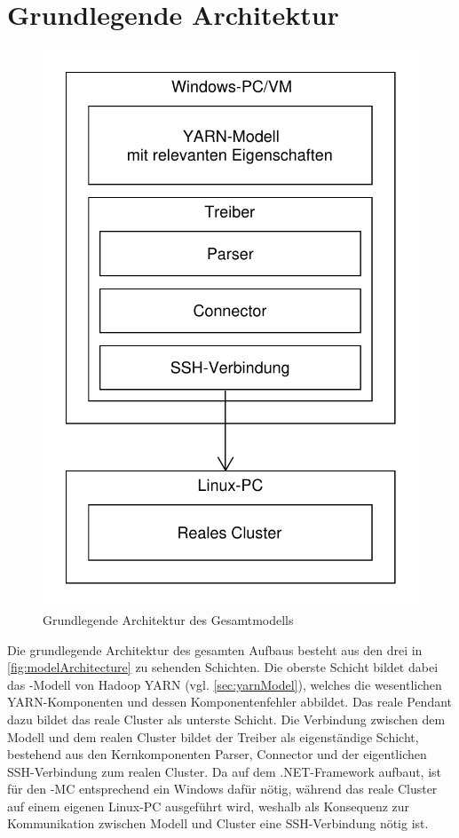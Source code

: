 \section{Grundlegende Architektur}\label{sec:architecture}


\begin{figure}
	\begin{center}
		\includegraphics[width=0.4\columnwidth]{./images/modelArchitecture.pdf}
	\end{center}
	\caption{Grundlegende Architektur des Gesamtmodells}
	\label{fig:modelArchitecture}
\end{figure}

Die grundlegende Architektur des gesamten Aufbaus besteht aus den drei in \autoref{fig:modelArchitecture} zu sehenden Schichten. Die oberste Schicht bildet dabei das \sS-Modell von Hadoop YARN (vgl. \autoref{sec:yarnModel}), welches die wesentlichen YARN-Komponenten und dessen Komponentenfehler abbildet. Das reale Pendant dazu bildet das reale Cluster als unterste Schicht. Die Verbindung zwischen dem Modell und dem realen Cluster bildet der Treiber als eigenständige Schicht, bestehend aus den Kernkomponenten Parser, Connector und der eigentlichen SSH-Verbindung zum realen Cluster. Da \sS auf dem .NET-Framework aufbaut, ist für den \sS-MC entsprechend ein Windows dafür nötig, während das reale Cluster auf einem eigenen Linux-PC ausgeführt wird, weshalb als Konsequenz zur Kommunikation zwischen Modell und Cluster eine SSH-Verbindung nötig ist.